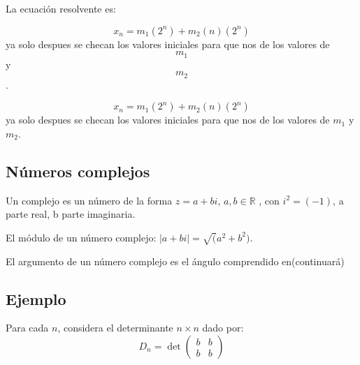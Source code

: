 \documentclass{article}
\begin{document}
La ecuaci\'on resolvente es:

$$x_n=m_1(2^n)+m_2(n)(2^n)$$
ya solo despues se checan los valores iniciales para que nos de los valores de $$m_1$$ y $$m_2$$.

$$x_n=m_1(2^n)+m_2(n)(2^n)$$
ya solo despues se checan los valores iniciales para que nos de los valores de $m_1$ y $m_2$.

\subsection{Números  complejos}

Un complejo es un número de la forma $z=a+bi$, $a,b\in\mathbb{R}$ , con $i^2=(-1)$, a parte real, b parte imaginaria.

El módulo de un número complejo: $|a+bi|=\surd(a^2+b^2)$.


El argumento de un número complejo es el ángulo comprendido en(continuará)


\subsection{Ejemplo}

Para cada $n$, considera el determinante $n\times n$ dado por:
\begin{equation}
  \label{eq:1}
  D_n=\det
  \begin{pmatrix}
    b & b\\
    b & b 
  \end{pmatrix}
\end{equation}
\end{document}
